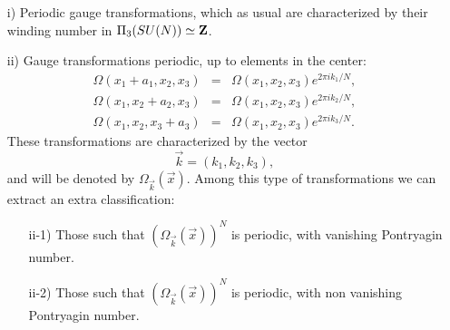 \begin{itemize}
	\item[{i)}] Periodic gauge transformations, which as
usual are characterized by their winding number in $\Pi_3(SU(N))
\simeq {\bf Z}$.
	\item[{ii)}] Gauge transformations periodic, up to
elements in the center:
\begin{eqnarray}
\Omega(x_1+a_1,x_2,x_3) & = & \Omega(x_1,x_2,x_3) e^{2 \pi i
k_1/N}, \nonumber \\
\Omega(x_1,x_2+a_2,x_3) & = & \Omega(x_1,x_2,x_3) e^{2 \pi i
k_2/N}, \nonumber \\
\Omega(x_1,x_2,x_3+a_3) & = & \Omega(x_1,x_2,x_3) e^{2 \pi i
k_3/N}.
\label{eq:I65}
\end{eqnarray}
These transformations are characterized by the vector
\begin{equation}
\vec{k} = (k_1,k_2,k_3),
\label{eq:I66}
\end{equation}
and will be denoted by $\Omega_{\vec{k}}(\vec{x})$. Among this
type of transformations we can extract an extra classification:
		\begin{itemize}
		\item[{ii-1)}] Those such that
$(\Omega_{\vec{k}}(\vec{x}))^N$ is periodic, with vanishing
Pontryagin number.
		\item[{ii-2)}] Those such that
$(\Omega_{\vec{k}}(\vec{x}))^N$ is periodic, with non vanishing
Pontryagin number.
		\end{itemize}
\end{itemize}
  
